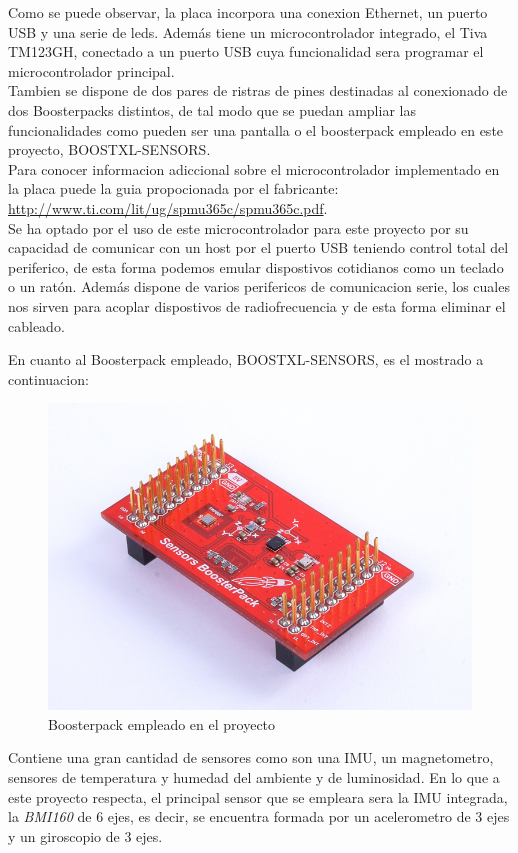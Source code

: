 \documentclass[a4paper,twoside]{article}
\begin{document}
Como se puede observar, la placa incorpora una conexion Ethernet, un puerto USB y una serie de leds. Además tiene un microcontrolador integrado, el Tiva TM123GH, conectado a un puerto USB cuya funcionalidad sera programar el microcontrolador principal. \\
Tambien se dispone de dos pares de ristras de pines destinadas al conexionado de dos Boosterpacks distintos, de tal modo que se puedan ampliar las funcionalidades como pueden ser una pantalla o el boosterpack empleado en este proyecto, BOOSTXL-SENSORS. \\

Para conocer informacion adiccional sobre el microcontrolador implementado en la placa puede la guia propocionada por el fabricante: \url{http://www.ti.com/lit/ug/spmu365c/spmu365c.pdf}. \\

Se ha optado por el uso de este microcontrolador para este proyecto por su capacidad de comunicar con un host por el puerto USB teniendo control total del periferico, de esta forma podemos emular dispostivos cotidianos como un teclado o un ratón. Además dispone de varios perifericos de comunicacion serie, los cuales nos sirven para acoplar dispostivos de radiofrecuencia y de esta forma eliminar el cableado.
\newpage

En cuanto al Boosterpack empleado, BOOSTXL-SENSORS, es el mostrado a continuacion: \\
\begin{figure}[h!]
 \centering
 \includegraphics[width=.3\textwidth]{../images/sensors_bp}
 \caption{Boosterpack empleado en el proyecto}
\end{figure}

Contiene una gran cantidad de sensores como son una IMU, un magnetometro, sensores de temperatura y humedad del ambiente y de luminosidad. En lo que a este proyecto respecta, el principal sensor que se empleara sera la IMU integrada, la \textit{BMI160} de 6 ejes, es decir, se encuentra formada por un acelerometro de 3 ejes y un giroscopio de 3 ejes. \\
\end{document}

